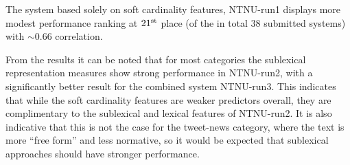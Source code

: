 The system based solely on soft cardinality features, NTNU-run1 displays more modest performance
ranking at $21^{\rm st}$ place (of the in total 38 submitted systems) with ${\sim}0.66$ correlation. 

From the results it can be noted that for most categories the sublexical representation measures show
strong performance in NTNU-run2, with a significantly better result for the combined system NTNU-run3. 
This indicates that while the soft cardinality features are weaker predictors overall, they are complimentary 
to the sublexical and lexical features of NTNU-run2. 
It is also indicative that this is not the case for the tweet-news category, where the text is more ``free form'' 
and less normative, so it would be expected that sublexical approaches should have stronger performance.

